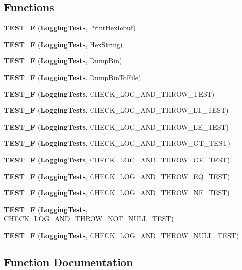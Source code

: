 \subsection*{Functions}
\begin{DoxyCompactItemize}
\item 
{\bf T\+E\+S\+T\+\_\+F} ({\bf Logging\+Tests}, Print\+Hex\+Iobuf)
\item 
{\bf T\+E\+S\+T\+\_\+F} ({\bf Logging\+Tests}, Hex\+String)
\item 
{\bf T\+E\+S\+T\+\_\+F} ({\bf Logging\+Tests}, Dump\+Bin)
\item 
{\bf T\+E\+S\+T\+\_\+F} ({\bf Logging\+Tests}, Dump\+Bin\+To\+File)
\item 
{\bf T\+E\+S\+T\+\_\+F} ({\bf Logging\+Tests}, C\+H\+E\+C\+K\+\_\+\+L\+O\+G\+\_\+\+A\+N\+D\+\_\+\+T\+H\+R\+O\+W\+\_\+\+T\+E\+ST)
\item 
{\bf T\+E\+S\+T\+\_\+F} ({\bf Logging\+Tests}, C\+H\+E\+C\+K\+\_\+\+L\+O\+G\+\_\+\+A\+N\+D\+\_\+\+T\+H\+R\+O\+W\+\_\+\+L\+T\+\_\+\+T\+E\+ST)
\item 
{\bf T\+E\+S\+T\+\_\+F} ({\bf Logging\+Tests}, C\+H\+E\+C\+K\+\_\+\+L\+O\+G\+\_\+\+A\+N\+D\+\_\+\+T\+H\+R\+O\+W\+\_\+\+L\+E\+\_\+\+T\+E\+ST)
\item 
{\bf T\+E\+S\+T\+\_\+F} ({\bf Logging\+Tests}, C\+H\+E\+C\+K\+\_\+\+L\+O\+G\+\_\+\+A\+N\+D\+\_\+\+T\+H\+R\+O\+W\+\_\+\+G\+T\+\_\+\+T\+E\+ST)
\item 
{\bf T\+E\+S\+T\+\_\+F} ({\bf Logging\+Tests}, C\+H\+E\+C\+K\+\_\+\+L\+O\+G\+\_\+\+A\+N\+D\+\_\+\+T\+H\+R\+O\+W\+\_\+\+G\+E\+\_\+\+T\+E\+ST)
\item 
{\bf T\+E\+S\+T\+\_\+F} ({\bf Logging\+Tests}, C\+H\+E\+C\+K\+\_\+\+L\+O\+G\+\_\+\+A\+N\+D\+\_\+\+T\+H\+R\+O\+W\+\_\+\+E\+Q\+\_\+\+T\+E\+ST)
\item 
{\bf T\+E\+S\+T\+\_\+F} ({\bf Logging\+Tests}, C\+H\+E\+C\+K\+\_\+\+L\+O\+G\+\_\+\+A\+N\+D\+\_\+\+T\+H\+R\+O\+W\+\_\+\+N\+E\+\_\+\+T\+E\+ST)
\item 
{\bf T\+E\+S\+T\+\_\+F} ({\bf Logging\+Tests}, C\+H\+E\+C\+K\+\_\+\+L\+O\+G\+\_\+\+A\+N\+D\+\_\+\+T\+H\+R\+O\+W\+\_\+\+N\+O\+T\+\_\+\+N\+U\+L\+L\+\_\+\+T\+E\+ST)
\item 
{\bf T\+E\+S\+T\+\_\+F} ({\bf Logging\+Tests}, C\+H\+E\+C\+K\+\_\+\+L\+O\+G\+\_\+\+A\+N\+D\+\_\+\+T\+H\+R\+O\+W\+\_\+\+N\+U\+L\+L\+\_\+\+T\+E\+ST)
\end{DoxyCompactItemize}


\subsection{Function Documentation}
